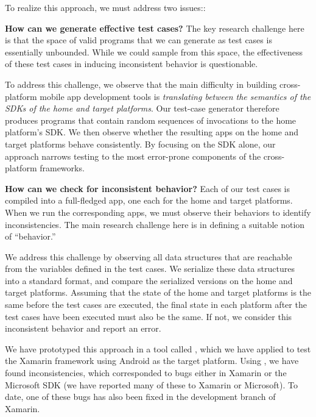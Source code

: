 To realize this approach, we must address two issues::
%
\begin{mylist}
%
\item \textbf{How can we generate effective test cases?} The key research
challenge here is that the space of valid programs that we can generate as test
cases is essentially unbounded. While we could sample from this space, the
effectiveness of these test cases in inducing inconsistent behavior is
questionable.

To address this challenge, we observe that the main difficulty in building
cross-platform mobile app development tools is \textit{translating between the
semantics of the SDKs of the home and target platforms}. Our test-case
generator therefore produces programs that contain random sequences of
invocations to the home platform's SDK. We then observe whether the resulting
apps on the home and target platforms behave consistently. By focusing on the
SDK alone, our approach narrows testing to the most error-prone components of
the cross-platform frameworks.

\item \textbf{How can we check for inconsistent behavior?} Each of our test
cases is compiled into a full-fledged app, one each for the home and target
platforms. When we run the corresponding apps, we must observe their behaviors
to identify inconsistencies. The main research challenge here is in defining a
suitable notion of ``behavior.''

We address this challenge by observing all data structures that are reachable
from the variables defined in the test cases. We serialize these data
structures into a standard format, and compare the serialized versions on the
home and target platforms. Assuming that the state of the home and target
platforms is the same before the test cases are executed, the final state in
each platform after the test cases have been executed must also be the same.
If not, we consider this inconsistent behavior and report an error.
%
\end{mylist}

We have prototyped this approach in a tool called \tool, which we have applied
to test the Xamarin framework using Android as the target platform. Using
\tool, we have found  inconsistencies, which corresponded to bugs
either in Xamarin or the Microsoft SDK (we have reported many of these to
Xamarin or Microsoft). To date, one of these bugs has also been fixed in the
development branch of Xamarin.
